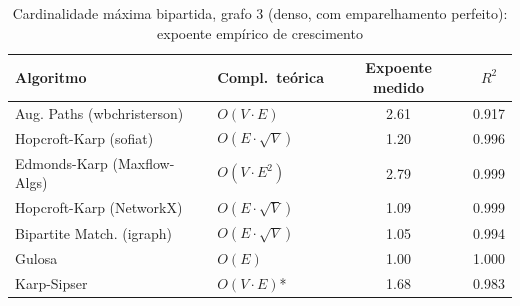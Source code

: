 \begin{table}[H]
    \centering
    \caption{Cardinalidade máxima bipartida, grafo 3 (denso, com emparelhamento perfeito): expoente empírico de crescimento}
    \label{tab:exp-mcm}
    \renewcommand{\arraystretch}{1.25}
    \footnotesize
    \begin{tabularx}{\textwidth}{@{} X l c c @{}}
        \toprule
        \textbf{Algoritmo} & \textbf{Compl.\ teórica} & \textbf{Expoente medido} & \textbf{$R^2$} \\
        \midrule
        Aug. Paths (wbchristerson) & $O(V \cdot E)$ & 2.61 & 0.917 \\
        Hopcroft-Karp (sofiat) & $O(E \cdot \sqrt{V})$ & 1.20 & 0.996 \\
        Edmonds-Karp (Maxflow-Algs) & $O(V \cdot E^{2})$ & 2.79 & 0.999 \\
        Hopcroft-Karp (NetworkX) & $O(E \cdot \sqrt{V})$ & 1.09 & 0.999 \\
        Bipartite Match. (igraph) & $O(E \cdot \sqrt{V})$ & 1.05 & 0.994 \\
        Gulosa & $O(E)$ & 1.00 & 1.000 \\
        Karp-Sipser & $O(V \cdot E)$* & 1.68 & 0.983 \\
        \bottomrule
    \end{tabularx}
\end{table}
